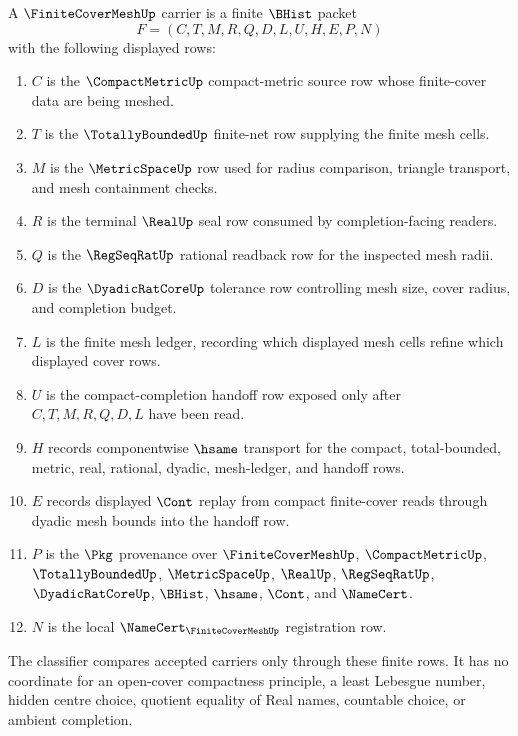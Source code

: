 \begin{definition}
\label{def:finite-cover-mesh-carrier}
A $\FiniteCoverMeshUp$ carrier is a finite $\BHist$ packet
$$
F=(C,T,M,R,Q,D,L,U,H,E,P,N)
$$
with the following displayed rows:
\begin{enumerate}
\item $C$ is the $\CompactMetricUp$ compact-metric source row whose finite-cover data are being meshed.
\item $T$ is the $\TotallyBoundedUp$ finite-net row supplying the finite mesh cells.
\item $M$ is the $\MetricSpaceUp$ row used for radius comparison, triangle transport, and mesh containment checks.
\item $R$ is the terminal $\RealUp$ seal row consumed by completion-facing readers.
\item $Q$ is the $\RegSeqRatUp$ rational readback row for the inspected mesh radii.
\item $D$ is the $\DyadicRatCoreUp$ tolerance row controlling mesh size, cover radius, and completion budget.
\item $L$ is the finite mesh ledger, recording which displayed mesh cells refine which displayed cover rows.
\item $U$ is the compact-completion handoff row exposed only after $C,T,M,R,Q,D,L$ have been read.
\item $H$ records componentwise $\hsame$ transport for the compact, total-bounded, metric, real, rational, dyadic, mesh-ledger, and handoff rows.
\item $E$ records displayed $\Cont$ replay from compact finite-cover reads through dyadic mesh bounds into the handoff row.
\item $P$ is the $\Pkg$ provenance over $\FiniteCoverMeshUp$, $\CompactMetricUp$, $\TotallyBoundedUp$, $\MetricSpaceUp$, $\RealUp$, $\RegSeqRatUp$, $\DyadicRatCoreUp$, $\BHist$, $\hsame$, $\Cont$, and $\NameCert$.
\item $N$ is the local $\NameCert_{\FiniteCoverMeshUp}$ registration row.
\end{enumerate}
The classifier compares accepted carriers only through these finite rows. It has no coordinate for an open-cover compactness principle, a least Lebesgue number, hidden centre choice, quotient equality of Real names, countable choice, or ambient completion.
\end{definition}

